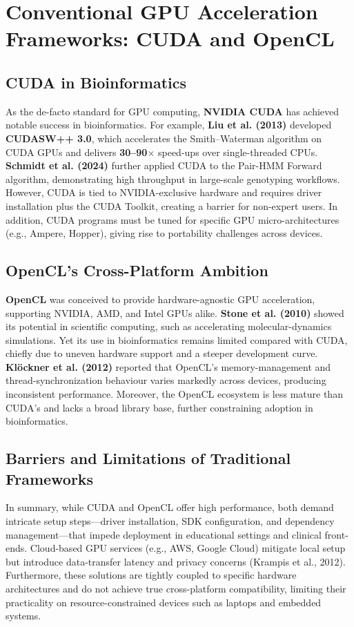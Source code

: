 \documentclass[12pt]{report}
\begin{document}
\section{Conventional GPU Acceleration Frameworks: CUDA and OpenCL}
\subsection{CUDA in Bioinformatics}
As the de-facto standard for GPU computing, \textbf{NVIDIA CUDA} has achieved notable success in bioinformatics. For example, \textbf{Liu et al. (2013)} developed \textbf{CUDASW++ 3.0}, which accelerates the Smith–Waterman algorithm on CUDA GPUs and delivers \textbf{30–90$\times$} speed-ups over single-threaded CPUs. \textbf{Schmidt et al. (2024)} further applied CUDA to the Pair-HMM Forward algorithm, demonstrating high throughput in large-scale genotyping workflows. However, CUDA is tied to NVIDIA-exclusive hardware and requires driver installation plus the CUDA Toolkit, creating a barrier for non-expert users. In addition, CUDA programs must be tuned for specific GPU micro-architectures (e.g., Ampere, Hopper), giving rise to portability challenges across devices.

\subsection{OpenCL’s Cross-Platform Ambition}
\textbf{OpenCL} was conceived to provide hardware-agnostic GPU acceleration, supporting NVIDIA, AMD, and Intel GPUs alike. \textbf{Stone et al. (2010)} showed its potential in scientific computing, such as accelerating molecular-dynamics simulations. Yet its use in bioinformatics remains limited compared with CUDA, chiefly due to uneven hardware support and a steeper development curve. \textbf{Klöckner et al. (2012)} reported that OpenCL’s memory-management and thread-synchronization behaviour varies markedly across devices, producing inconsistent performance. Moreover, the OpenCL ecosystem is less mature than CUDA’s and lacks a broad library base, further constraining adoption in bioinformatics.

\subsection{Barriers and Limitations of Traditional Frameworks}
In summary, while CUDA and OpenCL offer high performance, both demand intricate setup steps—driver installation, SDK configuration, and dependency management—that impede deployment in educational settings and clinical front-ends. Cloud-based GPU services (e.g., AWS, Google Cloud) mitigate local setup but introduce data-transfer latency and privacy concerns (Krampis et al., 2012). Furthermore, these solutions are tightly coupled to specific hardware architectures and do not achieve true cross-platform compatibility, limiting their practicality on resource-constrained devices such as laptops and embedded systems.
\end{document}
